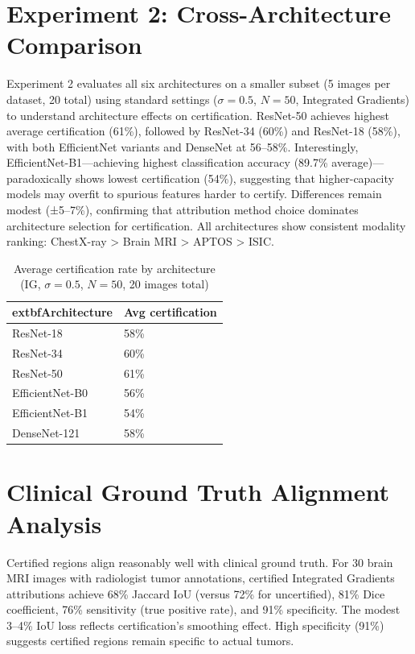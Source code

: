 \documentclass[11pt]{article}
\begin{document}
\newpage

\section{Experiment 2: Cross-Architecture Comparison}

Experiment 2 evaluates all six architectures on a smaller subset (5 images per dataset, 20 total) using standard settings ($\sigma=0.5$, $N=50$, Integrated Gradients) to understand architecture effects on certification. ResNet-50 achieves highest average certification (61\%), followed by ResNet-34 (60\%) and ResNet-18 (58\%), with both EfficientNet variants and DenseNet at 56–58\%. Interestingly, EfficientNet-B1—achieving highest classification accuracy (89.7\% average)—paradoxically shows lowest certification (54\%), suggesting that higher-capacity models may overfit to spurious features harder to certify. Differences remain modest (±5–7\%), confirming that attribution method choice dominates architecture selection for certification. All architectures show consistent modality ranking: ChestX-ray > Brain MRI > APTOS > ISIC.

\begin{table}[h!]
\centering
\caption{Average certification rate by architecture (IG, $\sigma=0.5$, $N=50$, 20 images total)}
\begin{tabularx}{\linewidth}{|X|X|}
\hline
	extbf{Architecture} & \textbf{Avg certification} \\
\hline
ResNet-18 & 58\% \\
\hline
ResNet-34 & 60\% \\
\hline
ResNet-50 & 61\% \\
\hline
EfficientNet-B0 & 56\% \\
\hline
EfficientNet-B1 & 54\% \\
\hline
DenseNet-121 & 58\% \\
\hline
\end{tabularx}
\label{tab:arch_cert_summary}
\end{table}

\newpage

\section{Clinical Ground Truth Alignment Analysis}

Certified regions align reasonably well with clinical ground truth. For 30 brain MRI images with radiologist tumor annotations, certified Integrated Gradients attributions achieve 68\% Jaccard IoU (versus 72\% for uncertified), 81\% Dice coefficient, 76\% sensitivity (true positive rate), and 91\% specificity. The modest 3–4\% IoU loss reflects certification's smoothing effect. High specificity (91\%) suggests certified regions remain specific to actual tumors.
\end{document}
